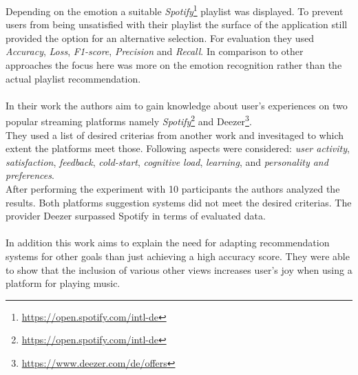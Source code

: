 \documentclass[runningheads,a4paper]{llncs}
\begin{document}
Depending on the emotion a suitable \textit{Spotify}\footnote{\url{https://open.spotify.com/intl-de}} playlist was displayed.
To prevent users from being unsatisfied with their playlist the surface of the application still provided the option for an alternative selection.
For evaluation they used \textit{Accuracy}, \textit{Loss}, \textit{F1-score}, \textit{Precision} and \textit{Recall}.
In comparison to other approaches the focus here was more on the emotion recognition rather than the actual playlist recommendation.\cite{priyanka2023novel}\\
\\
In their work \cite{de2022evaluating} the authors aim to gain knowledge about user's experiences on two popular streaming platforms namely 
\textit{Spotify}\footnote{\url{https://open.spotify.com/intl-de}} and Deezer\footnote{\url{https://www.deezer.com/de/offers}}. \\
They used a list of desired criterias from another work and invesitaged to which extent the platforms meet those.
Following aspects were considered:
\textit{user activity},
\textit{satisfaction},
\textit{feedback},
\textit{cold-start},
\textit{cognitive load},
\textit{learning},
and \textit{personality and preferences}.\\
After performing the experiment with 10 participants the authors analyzed the results.
Both platforms suggestion systems did not meet the desired criterias. 
The provider Deezer surpassed Spotify in terms of evaluated data. \\
\\
In addition this work aims to explain the need for adapting recommendation systems for other goals than just achieving a high accuracy score.
They were able to show that the inclusion of various other views increases user's joy when using a platform for playing music.
\end{document}
